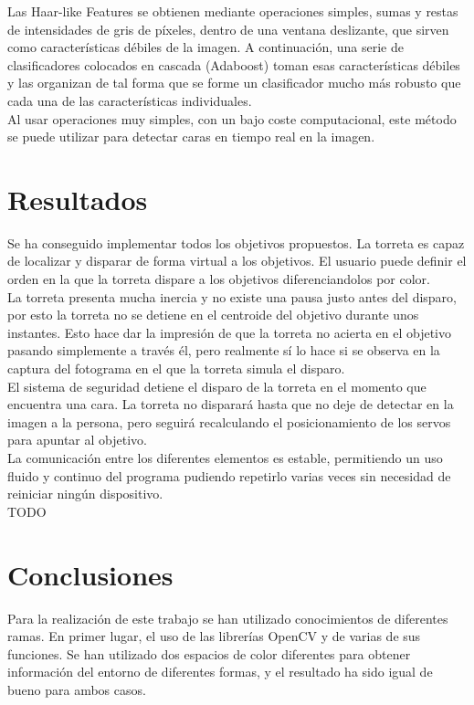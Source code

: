 Las Haar-like Features se obtienen mediante operaciones simples, sumas y restas de intensidades de gris de píxeles, dentro de una ventana deslizante, que sirven como características débiles de la imagen. 
A continuación, una serie de clasificadores colocados en cascada (Adaboost) toman esas características débiles y las organizan de tal forma que se forme un clasificador mucho más robusto que cada una de las características individuales.\\

Al usar operaciones muy simples, con un bajo coste computacional, este método se puede utilizar para detectar caras en tiempo real en la imagen.\\

\newpage


\section{Resultados}
Se ha conseguido implementar todos los objetivos propuestos. La torreta es capaz de localizar y disparar de forma virtual a los objetivos. El usuario puede definir el orden en la que la torreta dispare a los objetivos diferenciandolos por color.\\

La torreta presenta mucha inercia y no existe una pausa justo antes del disparo, por esto la torreta no se detiene en el centroide del objetivo durante unos instantes. Esto hace dar la impresión de que la torreta no acierta en el objetivo pasando simplemente a través él, pero realmente sí lo hace si se observa en la captura del fotograma en el que la torreta simula el disparo.\\

El sistema de seguridad detiene el disparo de la torreta en el momento que encuentra una cara. 
La torreta no disparará hasta que no deje de detectar en la imagen a la persona, pero seguirá recalculando el posicionamiento de los servos para apuntar al objetivo.\\

La comunicación entre los diferentes elementos es estable, permitiendo un uso fluido y continuo del programa pudiendo repetirlo varias veces sin necesidad de reiniciar ningún dispositivo.\\
TODO

\newpage


\section{Conclusiones}
Para la realización de este trabajo se han utilizado conocimientos de diferentes ramas. En primer lugar, el uso de las librerías OpenCV y de varias de sus funciones. Se han utilizado dos espacios de color diferentes para obtener información del entorno de diferentes formas, y el resultado ha sido igual de bueno para ambos casos.\\

